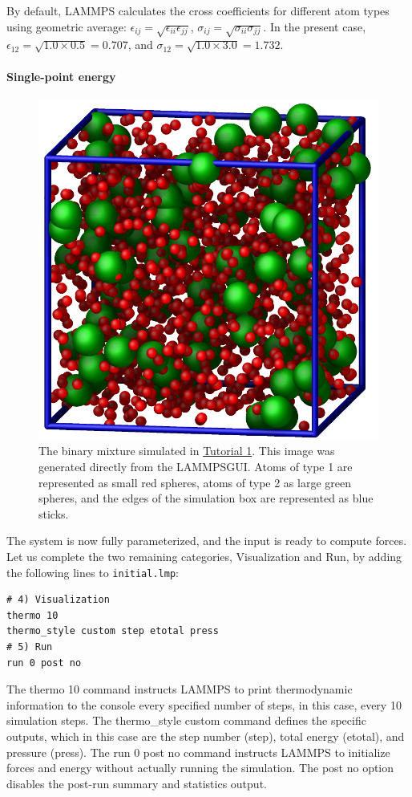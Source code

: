 \documentclass[9pt,tutorial]{livecoms}
\newcommand{\lmpcmd}[1]{\hspace{0pt}\colorbox{listing}{\textcolor{command}{\small{#1}}}\hspace{0pt}} %
\newcommand{\flecmd}[1]{\textcolor{command}{\texttt{#1}}} %
\newcommand{\lammpsgui}{\textsf{LAMMPS\textendash GUI}}
\begin{document}
\begin{note}
By default, LAMMPS calculates the cross coefficients for different atom
types using geometric average: $\epsilon_{ij} = \sqrt{\epsilon_{ii} \epsilon_{jj}}$,
$\sigma_{ij} = \sqrt{\sigma_{ii} \sigma_{jj}}$.  In the present case,
$\epsilon_{12} = \sqrt{1.0 \times 0.5} = 0.707$, and
$\sigma_{12} = \sqrt{1.0 \times 3.0} = 1.732$.
\end{note}

\paragraph{Single-point energy}

\begin{figure}
\centering
\includegraphics[width=0.55\linewidth]{LJ}
\caption{The binary mixture simulated in \hyperref[lennard-jones-label]{Tutorial 1}.
  This image was generated directly from the \lammpsgui{}.  Atoms of
  type 1 are represented as small red spheres, atoms of type 2 as large
  green spheres, and the edges of the simulation box are represented as blue sticks.}
\label{fig:LJ}
\end{figure}

The system is now fully parameterized, and the input is ready to compute
forces.  Let us complete the two remaining categories,
\lmpcmd{Visualization} and \lmpcmd{Run}, by adding the following lines
to \flecmd{initial.lmp}:
\begin{lstlisting}
# 4) Visualization
thermo 10
thermo_style custom step etotal press
# 5) Run
run 0 post no
\end{lstlisting}
The \lmpcmd{thermo 10} command instructs LAMMPS to print thermodynamic
information to the console every specified number of steps, in this case,
every 10 simulation steps.  The \lmpcmd{thermo\_style custom} command
defines the specific outputs, which in this case are the step number
(\lmpcmd{step}), total energy (\lmpcmd{etotal}), and pressure (\lmpcmd{press}).
The \lmpcmd{run 0 post no} command instructs LAMMPS to initialize forces and energy
without actually running the simulation.  The \lmpcmd{post no} option disables
the post-run summary and statistics output.
\end{document}
